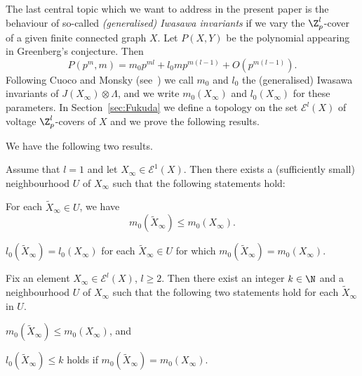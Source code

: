 The last central topic which we want to address in the present paper is the behaviour of so-called \emph{(generalised) Iwasawa invariants} if we vary the $\Z_p^l$-cover of a given finite connected graph $X$. Let $P(X,Y)$ be the polynomial appearing in Greenberg's conjecture. Then
\[P(p^m,m)=m_0p^{ml}+l_0mp^{m(l-1)}+O(p^{m(l-1)}).\]
Following Cuoco and Monsky (see~\cite{cuoco-monsky}) we call $m_0$ and $l_0$ the (generalised) Iwasawa invariants of $J(X_\infty)\otimes \Lambda$, and we write $m_0(X_\infty)$ and $l_0(X_\infty)$ for these parameters. In Section~\ref{sec:Fukuda} we define a topology on the set $\mathcal{E}^l(X)$ of voltage $\Z_p^l$-covers of $X$ and we prove the following results. 
\begin{theo*}
	We have the following two results. 
	\begin{compactenum}
		\item Assume that $l=1$ and let ${X_\infty \in \mathcal{E}^1(X)}$. Then there exists a (sufficiently small) neighbourhood $U$ of $X_\infty$ such that the following statements hold: \begin{compactenum}[(a)] 
			\item For each ${\tilde{X}_\infty \in U}$, we have 
			\[ m_0(\tilde{X}_\infty) \le m_0(X_\infty). \] 
			\item ${l_0(\tilde{X}_\infty) = l_0(X_\infty)}$ for each ${\tilde{X}_\infty \in U}$ for which ${m_0(\tilde{X}_\infty) = m_0(X_\infty)}$. 
							\end{compactenum} 
		\item Fix an element ${X_\infty \in \mathcal{E}^l(X)}$, ${l \ge 2}$. Then there exist an integer ${k \in \N}$ and a neighbourhood $U$ of $X_\infty$ such that the following two statements hold for each ${\tilde{X}_\infty}$ in $U$. \begin{compactenum}[(a)] 
			\item $m_0(\tilde{X}_\infty) \le m_0(X_\infty)$, and 
			\item $l_0(\tilde{X}_\infty) \le k$ holds if ${m_0(\tilde{X}_\infty) = m_0(X_\infty)}$. 
		\end{compactenum} 
	\end{compactenum}
\end{theo*}

